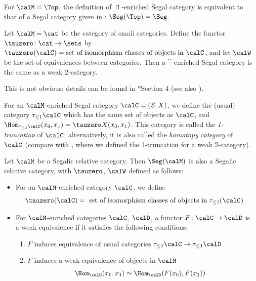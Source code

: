 \begin{example}\label{x:top-segal}
  For $\calM=\Top$, the definition of $\Top$-enriched Segal category is
  equivalent to that of a Segal category given in :
  $\Seg(\Top) = \Seg$.
\end{example}
\begin{example}\label{x:tamsamani-2cat}
  Let $\calM=\cat$ be the category of small categories. Define the functor
  $\tauzero\colon \cat\to \sets$ by $\tauzero(\calC)=\text{set of isomorphism
  classes of objects in }\calC$, and let $\calW$ be the set of equivalences
  between categories. Then a $\cat$-enriched Segal category is the same as a
  weak 2-category.

  This is not obvious; details can be found in *{Section 4}
  (see also ).
\end{example}
For an $\calM$-enriched Segal category $\calC=(S, X)$, we define the (usual)
category $\tau_{\leq 1}\calC$ which has the same set of objects as $\calC$, and
$\Hom_{\tau_{\leq 1} \calC}(x_0, x_1)=\tauzero X(x_0, x_1)$. This category
is called the \emph{1-truncation} of $\calC$; alternatively, it is also called
the \emph{homotopy category} of $\calC$ (compare with
 , where we defined the 1-truncation for a weak 2-category).

\begin{theorem}\label{t:segalic}
  Let $\calM$ be a Segalic relative category. Then $\Seg(\calM)$ is
  also a Segalic relative
  category, with $\tauzero$, $\calW$ defined as follows:
  \begin{itemize}
    \item For an $\calM$-enriched category $\calC$, we define
     $$
      \tauzero(\calC)=
      \text{ set of isomorphism classes of objects in }\tau_{\leq 1}(\calC)
     $$
    \item For $\calM$-enriched categories $\calC$, $\calD$, a functor
    $F \colon \calC\to \calD$ is a weak equivalence if it satisfies the
    following conditions:
    \begin{enumerate}
      \item $F$ induces equivalence of usual categories
        $\tau_{\leq 1}\calC \to \tau_{\leq 1}\calD$
      \item $F$ induces a weak equivalence of objects in $\calM$
        $$
        \Hom_{\calC}(x_0, x_1)\simeq \Hom_{\calD}(F(x_0), F(x_1))
        $$
    \end{enumerate}
  \end{itemize}
\end{theorem}

